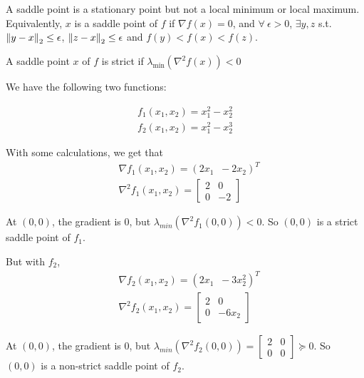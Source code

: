 \begin{definition}
    A saddle point is a stationary point but not a local minimum or local maximum. Equivalently, \(x\) is a saddle point of \(f\) if \(\nabla f(x) = 0\), and \(\forall \ \epsilon > 0\), \(\exists y, z \) s.t. \(\norm{y-x}_2 \leq \epsilon\), \(\norm{z - x}_2 \leq \epsilon\) and \(f(y)  < f(x) < f(z)\). 
\end{definition}


\begin{definition}
    A saddle point \(x\) of \(f\) is strict if 
    \(\lambda_{\text{min}} (\nabla^2 f(x)) < 0\)
\end{definition}


\begin{eg}
    
    We have the following two functions:

\begin{align*}
    f_1(x_1, x_2) = x_1^2 - x_2^2 \\  
    f_2(x_1, x_2) = x_1^2 - x_2^3
\end{align*}

With some calculations, we get that 
\begin{align*}
    &\nabla f_1(x_1, x_2) = (2x_1 \;\; -2x_2)^T  \\
    &\nabla^2 f_1(x_1, x_2) = \begin{bmatrix} 2 & 0 \\ 0 & -2 \end{bmatrix}
\end{align*}

At $(0,0)$, the gradient is $0$, but $\lambda_{min}(\nabla^2 f_1(0,0)) < 0$. So $(0,0)$ is a strict saddle point of $f_1$.

But with $f_2$, 
\begin{align*}
    &\nabla f_2(x_1, x_2) = (2x_1 \;\; -3x_2^2)^T  \\
    &\nabla^2 f_2(x_1, x_2) = \begin{bmatrix} 2 & 0 \\ 0 & -6x_2 \end{bmatrix}
\end{align*}

At $(0,0)$, the gradient is $0$, but $\lambda_{min}(\nabla^2 f_2(0,0)) = \begin{bmatrix} 2 & 0 \\ 0 & 0 \end{bmatrix} \succeq 0$. So $(0,0)$ is a non-strict saddle point of $f_2$.
\end{eg}


